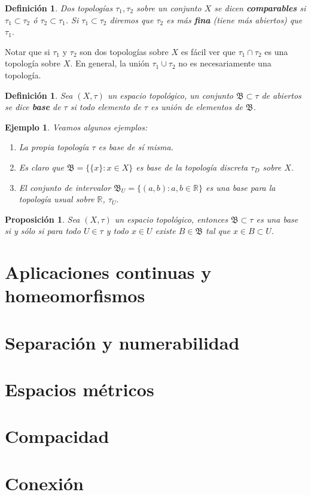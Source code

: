 \documentclass[12pt]{article}
\newtheorem{proposition}[theorem]{Proposición}
\newtheorem{definition}[theorem]{Definición}
\newtheorem{example}{Ejemplo}[theorem]
\begin{document}
\begin{definition}Dos topologías $\tau_1, \tau_2$ sobre un conjunto $X$ se dicen \textbf{comparables} si $\tau_1 \subset \tau_2$ ó $\tau_2 \subset \tau_1$. Si $\tau_1 \subset \tau_2$ diremos que $\tau_2$ es más \textbf{fina} (tiene más abiertos) que $\tau_1$.
\end{definition}

Notar que si $\tau_1$ y $\tau_2$ son dos topologías sobre $X$ es fácil ver que $\tau_1 \cap \tau_2$ es una topología sobre $X$. En general, la unión $\tau_1 \cup \tau_2$ no es necesariamente una topología.

\begin{definition}Sea $(X, \tau)$ un espacio topológico, un conjunto $\mathfrak{B} \subset \tau$ de abiertos se dice \textbf{base} de $\tau$ si todo elemento de $\tau$ es unión de elementos de $\mathfrak{B}$.
\end{definition}

\begin{example}Veamos algunos ejemplos:
\begin{enumerate}
\item La propia topología $\tau$ es base de sí misma.
\item Es claro que $\mathfrak{B} = \lbrace \lbrace x \rbrace : x \in X \rbrace$ es base de la topología discreta $\tau_D$ sobre $	X$.
\item El conjunto de intervalor $\mathfrak{B}_U = \lbrace (a,b):a,b \in \mathbb{R} \rbrace$ es una base para la topología usual sobre $\mathbb{R}$, $\tau_U.$
\end{enumerate}
\end{example}

\begin{proposition}Sea $(X, \tau)$ un espacio topológico, entonces $\mathfrak{B} \subset \tau$ es una base si y sólo si para todo $U \in \tau$ y todo $x \in U$ existe $B \in \mathfrak{B}$ tal que $x \in B \subset U$.
\end{proposition}
\section{Aplicaciones continuas y homeomorfismos}
\section{Separación y numerabilidad}
\section{Espacios métricos}
\section{Compacidad}
\section{Conexión}
\end{document}
